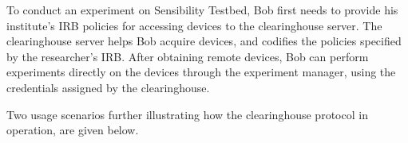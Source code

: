 {{To conduct an experiment on Sensibility Testbed, Bob first 
needs to provide his institute's IRB policies for accessing devices to 
the clearinghouse server.  
The clearinghouse server helps Bob acquire devices, and codifies 
the policies specified by the researcher's IRB. 
After obtaining remote devices, Bob can perform
experiments directly on the devices through the experiment manager, 
using the credentials assigned by the clearinghouse. 


Two usage scenarios further illustrating how the clearinghouse 
protocol in operation, are given below.

\smallskip

}}
